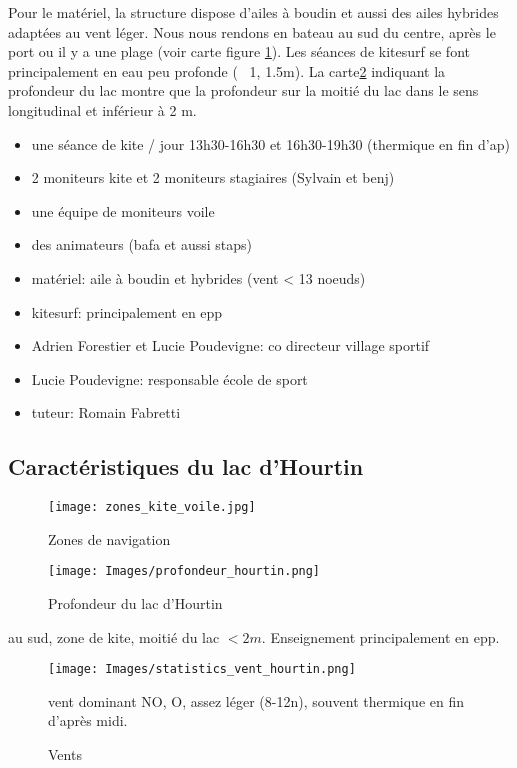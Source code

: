 \documentclass[12pt,a4paper]{report}
\begin{document}
Pour le matériel, la structure dispose d'ailes à boudin et aussi des ailes 
hybrides adaptées au vent léger.
Nous nous rendons en bateau au sud du centre, après le port ou il y a 
une plage (voir carte figure \ref{zones_nav}).
Les séances de kitesurf se font principalement en eau peu profonde (~ 1, 1.5m).
La carte\ref{carte_profondeur} indiquant la profondeur du lac montre que la profondeur sur 
la moitié du lac dans le sens longitudinal 
et inférieur à 2 m.
\begin{itemize}
\item une séance de kite / jour 13h30-16h30 et 16h30-19h30 (thermique en fin d'ap)
\item 2 moniteurs kite  et 2 moniteurs stagiaires (Sylvain et benj)
\item une équipe de moniteurs voile
\item des animateurs (bafa et aussi staps)
\item matériel: aile à boudin et hybrides (vent < 13 noeuds)
\item kitesurf: principalement en epp 
\item Adrien Forestier et Lucie Poudevigne: co directeur village sportif
\item Lucie Poudevigne: responsable école de sport
\item tuteur: Romain Fabretti
\end{itemize}

\subsection{Caractéristiques du lac d'Hourtin}
\begin{figure}
\texttt{[image: zones\_kite\_voile.jpg]} 
\caption{Zones de navigation\label{zones_nav}}
\end{figure}
\begin{figure}
\texttt{[image: Images/profondeur\_hourtin.png]} 
\caption{Profondeur du lac d'Hourtin\label{carte_profondeur}}
\end{figure}
au sud, zone de kite, moitié du lac $ < 2m$. Enseignement principalement en epp.
\begin{figure}
\texttt{[image: Images/statistics\_vent\_hourtin.png]} 
\caption{Vents\label{vent_stats}}
vent dominant NO, O, assez léger (8-12n),  souvent thermique en fin d'après midi.
\end{figure}
\end{document}

